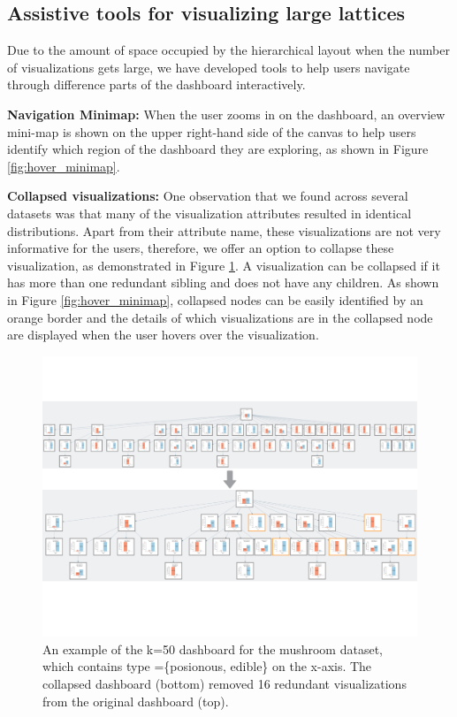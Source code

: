 \subsection{Assistive tools for visualizing large lattices}
Due to the amount of space occupied by the hierarchical layout when the number of visualizations gets large, we have developed tools to help users navigate through difference parts of the dashboard interactively. 
\par \textbf{Navigation Minimap:}  When the user zooms in on the dashboard, an overview mini-map is shown on the upper right-hand side of the canvas to help users identify which region of the dashboard they are exploring, as shown in Figure \ref{fig:hover_minimap}. 
\par \textbf{Collapsed visualizations:} 
One observation that we found across several datasets was that many of the visualization attributes resulted in identical distributions. Apart from their attribute name, these visualizations are not very informative for the users, therefore, we offer an option to collapse these visualization, as demonstrated in Figure \ref{fig:collapse_demo}. A visualization can be collapsed if it has more than one redundant sibling and does not have any children. As shown in Figure \ref{fig:hover_minimap}, collapsed nodes can be easily identified by an orange border and the details of which visualizations are in the collapsed node are displayed when the user hovers over the visualization.
\begin{figure}[ht!]
\centering
\includegraphics[width=\linewidth]{figures/collapsed_example.pdf}
\caption{An example of the k=50 dashboard for the mushroom dataset\cite{mushroom}, which contains type =\{posionous, edible\} on the x-axis. The collapsed dashboard (bottom) removed 16 redundant visualizations from the original dashboard (top).}
\label{fig:collapse_demo}
\end{figure}
